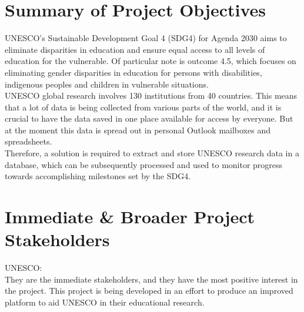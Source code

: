 \documentclass[11pt]{article}
\begin{document}

\maketitle %

\thispagestyle{empty} %

\newpage
\tableofcontents
\newpage


\section{Summary of Project Objectives}

UNESCO's Sustainable Development Goal 4 (SDG4) for Agenda 2030 aims to eliminate disparities in education and ensure equal access to all levels of education for the vulnerable. Of particular note is outcome 4.5, which focuses on eliminating gender disparities in education for persons with disabilities, indigenous peoples and children in vulnerable situations. \\

UNESCO global research involves 130 institutions from 40 countries. This means that a lot of data is being collected from various parts of the world, and it is crucial to have the data saved in one place available for access by everyone. But at the moment this data is spread out in personal Outlook mailboxes and spreadsheets. \\

Therefore, a solution is required to extract and store UNESCO research data in a database, which can be subsequently processed and used to monitor progress towards accomplishing milestones set by the SDG4. \\

\section{Immediate & Broader Project Stakeholders}

UNESCO: \\
They are the immediate stakeholders, and they have the most positive interest in the project. This project is being developed in an effort to produce an improved platform to aid UNESCO in their educational research. \\
\end{document}
